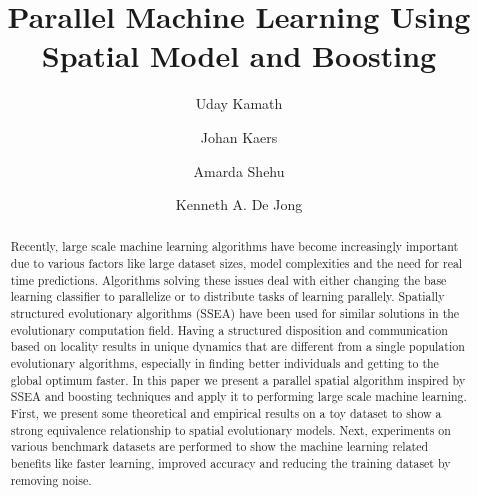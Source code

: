 \documentclass{llncs}
\begin{document}
%
\title{Parallel Machine Learning Using Spatial Model and Boosting }
%
%
\author{Uday Kamath \and Johan Kaers \and
Amarda Shehu\and Kenneth A. De Jong}
%
%
%

\maketitle              %

\begin{abstract}
Recently, large scale machine learning algorithms have become increasingly important due to various factors like large dataset sizes, model complexities and the need for real time predictions. Algorithms solving these issues deal with either changing the base learning classifier to parallelize or to distribute tasks of learning parallely. Spatially structured evolutionary algorithms (SSEA) have been used for similar solutions in the evolutionary computation field. Having a structured disposition and communication based on locality results in unique dynamics that are different from a single population evolutionary algorithms, especially in finding better individuals and getting to the global optimum faster. In this paper we present a parallel spatial algorithm inspired by SSEA and boosting techniques and apply it to performing large scale machine learning. First, we present some theoretical and empirical results on a toy dataset to show a strong equivalence relationship to spatial evolutionary models. Next, experiments on various benchmark datasets are performed to show the machine learning related benefits like faster learning, improved accuracy and reducing the training dataset by removing noise.
\end{abstract}
%
\end{document}
